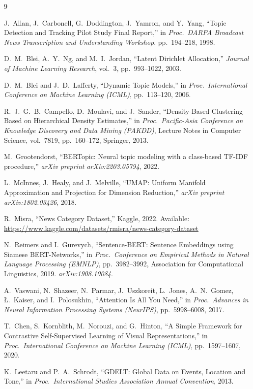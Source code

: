 \documentclass[10pt,twocolumn,a4paper]{article}
\begin{document}
\begin{thebibliography}{9}
\small

J.~Allan, J.~Carbonell, G.~Doddington, J.~Yamron, and Y.~Yang,
``Topic Detection and Tracking Pilot Study Final Report,''
in \emph{Proc.\ DARPA Broadcast News Transcription and Understanding Workshop},
pp.~194--218, 1998.

D.~M.~Blei, A.~Y.~Ng, and M.~I.~Jordan,
``Latent Dirichlet Allocation,''
\emph{Journal of Machine Learning Research}, vol.~3, pp.~993--1022, 2003.

D.~M.~Blei and J.~D.~Lafferty,
``Dynamic Topic Models,''
in \emph{Proc.\ International Conference on Machine Learning (ICML)},
pp.~113--120, 2006.

R.~J.~G.~B.~Campello, D.~Moulavi, and J.~Sander,
``Density-Based Clustering Based on Hierarchical Density Estimates,''
in \emph{Proc.\ Pacific-Asia Conference on Knowledge Discovery and Data Mining (PAKDD)},
Lecture Notes in Computer Science, vol.~7819, pp.~160--172, Springer, 2013.

M.~Grootendorst,
``BERTopic: Neural topic modeling with a class-based TF-IDF procedure,''
\emph{arXiv preprint arXiv:2203.05794}, 2022.

L.~McInnes, J.~Healy, and J.~Melville,
``UMAP: Uniform Manifold Approximation and Projection for Dimension Reduction,''
\emph{arXiv preprint arXiv:1802.03426}, 2018.

R.~Misra,
``News Category Dataset,''
Kaggle, 2022.
Available: \url{https://www.kaggle.com/datasets/rmisra/news-category-dataset}

N.~Reimers and I.~Gurevych,
``Sentence-BERT: Sentence Embeddings using Siamese BERT-Networks,''
in \emph{Proc.\ Conference on Empirical Methods in Natural Language Processing (EMNLP)},
pp.~3982--3992, Association for Computational Linguistics, 2019.
\emph{arXiv:1908.10084}.

A.~Vaswani, N.~Shazeer, N.~Parmar, J.~Uszkoreit, L.~Jones, A.~N.~Gomez,
{\L}.~Kaiser, and I.~Polosukhin,
``Attention Is All You Need,''
in \emph{Proc.\ Advances in Neural Information Processing Systems (NeurIPS)},
pp.~5998--6008, 2017.

T.~Chen, S.~Kornblith, M.~Norouzi, and G.~Hinton,
``A Simple Framework for Contrastive Self-Supervised Learning of Visual Representations,''
in \emph{Proc.\ International Conference on Machine Learning (ICML)},
pp.~1597--1607, 2020.

K.~Leetaru and P.~A.~Schrodt,
``GDELT: Global Data on Events, Location and Tone,''
in \emph{Proc.\ International Studies Association Annual Convention}, 2013.

\end{thebibliography}
\end{document}
